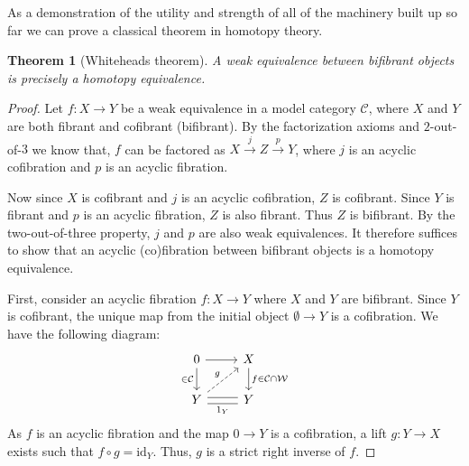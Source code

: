 \documentclass[12pt]{report}
\numberwithin{equation}{section}
\newtheorem{theorem}[dummy]{Theorem}
\begin{document}
	As a demonstration of the utility and strength of all of the machinery built up so far we can prove a classical theorem in homotopy theory.
	\begin{theorem}[Whiteheads theorem]
		A weak equivalence between bifibrant objects is precisely a homotopy equivalence.	
	\end{theorem}
	\begin{proof}
		Let \(f: X \to Y\) be a weak equivalence in a model category \(\mathcal{C}\), where \(X\) and \(Y\) are both fibrant and cofibrant (bifibrant).
		By the factorization axioms and \( 2 \)-out-of-\( 3 \) we know that, \(f\) can be factored as \(X \xrightarrow{j} Z \xrightarrow{p} Y\), where \(j\) is an acyclic cofibration and \(p\) is an acyclic fibration. 
		
		Now since \(X\) is cofibrant and \(j\) is an acyclic cofibration, \(Z\) is cofibrant. Since \(Y\) is fibrant and \(p\) is an acyclic fibration, \(Z\) is also fibrant. Thus \(Z\) is bifibrant. By the two-out-of-three property, \(j\) and \(p\) are also weak equivalences.
		It therefore suffices to show that an acyclic (co)fibration between bifibrant objects is a homotopy equivalence.
		
		First, consider an acyclic fibration \(f: X \to Y\) where \(X\) and \(Y\) are bifibrant.
		Since \(Y\) is cofibrant, the unique map from the initial object \(\emptyset \to Y\) is a cofibration. We have the following diagram:
		\[\begin{tikzcd}
			0 & X \\
			Y & Y
			\arrow[from=1-1, to=1-2]
			\arrow["{\in \mathcal{C}}"', from=1-1, to=2-1]
			\arrow["{f\in \mathcal{C\cap W}}", from=1-2, to=2-2]
			\arrow["g", dashed, from=2-1, to=1-2]
			\arrow[shift left, no head, from=2-1, to=2-2]
			\arrow["{1_Y}"', shift right, no head, from=2-1, to=2-2]
		\end{tikzcd}\]
		As \(f\) is an acyclic fibration and the map \(0 \to Y\) is a cofibration, a lift \(g: Y \to X\) exists such that \(f \circ g = \text{id}_Y\). Thus, \(g\) is a strict right inverse of \(f\).
		

\end{proof}
\end{document}
